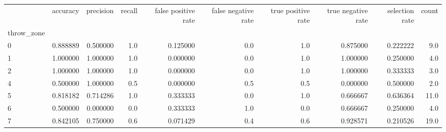 \begin{tabular}{lrrrrrrrrr}
\toprule
{} &  accuracy &  precision &  recall &  false positive rate &  false negative rate &  true positive rate &  true negative rate &  selection rate &  count \\
throw\_zone &           &            &         &                      &                      &                     &                     &                 &        \\
\midrule
0          &  0.888889 &   0.500000 &     1.0 &             0.125000 &                  0.0 &                 1.0 &            0.875000 &        0.222222 &    9.0 \\
1          &  1.000000 &   1.000000 &     1.0 &             0.000000 &                  0.0 &                 1.0 &            1.000000 &        0.250000 &    4.0 \\
2          &  1.000000 &   1.000000 &     1.0 &             0.000000 &                  0.0 &                 1.0 &            1.000000 &        0.333333 &    3.0 \\
4          &  0.500000 &   1.000000 &     0.5 &             0.000000 &                  0.5 &                 0.5 &            0.000000 &        0.500000 &    2.0 \\
5          &  0.818182 &   0.714286 &     1.0 &             0.333333 &                  0.0 &                 1.0 &            0.666667 &        0.636364 &   11.0 \\
6          &  0.500000 &   0.000000 &     0.0 &             0.333333 &                  1.0 &                 0.0 &            0.666667 &        0.250000 &    4.0 \\
7          &  0.842105 &   0.750000 &     0.6 &             0.071429 &                  0.4 &                 0.6 &            0.928571 &        0.210526 &   19.0 \\
\bottomrule
\end{tabular}
